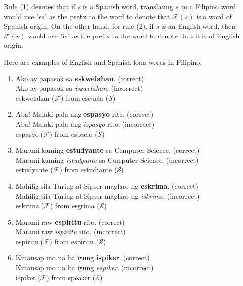 Rule (1) denotes that if \(s\) is a Spanish word, translating \(s\) to a Filipino
word would use "es" as the prefix to the word to denote that \(\mathcal{F}(s)\)
is a word of Spanish origin. On the other hand, for rule (2), if \(s\) is an
English word, then \(\mathcal{F}(s)\) would use "is" as the prefix to the word
to denote that it is of English origin.

\begin{example}
      Here are examples of English and Spanish loan words in Filipino:
\end{example}
\begin{enumerate}
      \item Ako ay papasok sa \textbf{eskwelahan}. (correct) \\
            Ako ay papasok sa \textit{iskwelahan}. (incorrect) \\
            eskwelahan (\(\mathcal{F}\)) from escuela (\(\mathcal{S}\))
      \item Aba! Malaki pala ang \textbf{espasyo} rito. (correct) \\
            Aba! Malaki pala ang \textit{ispasyo} rito. (incorrect) \\
            espasyo (\(\mathcal{F}\)) from espacio (\(\mathcal{S}\))
      \item Marami kaming \textbf{estudyante} sa Computer Science. (correct) \\
            Marami kaming \textit{istudyante} sa Computer Science. (incorrect)\\
            estudyante (\(\mathcal{F}\)) from estudiante (\(\mathcal{S}\))
      \item Mahilig sila Turing at Sipser maglaro ng \textbf{eskrima}. (correct) \\
            Mahilig sila Turing at Sipser maglaro ng \textit{iskrima}. (incorrect) \\
            eskrima  (\(\mathcal{F}\)) from esgrima (\(\mathcal{S}\))
      \item Marami raw \textbf{espiritu} rito. (correct) \\
            Marami raw \textit{ispiritu} rito. (incorrect) \\
            espiritu (\(\mathcal{F}\)) from espiritu (\(\mathcal{S}\))
      \item Kinausap mo na ba iyung \textbf{ispiker}. (correct) \\
            Kinausap mo na ba iyung \textit{espiker}. (incorrect) \\
            ispiker (\(\mathcal{F}\)) from speaker (\(\mathcal{E}\))

\end{enumerate}
